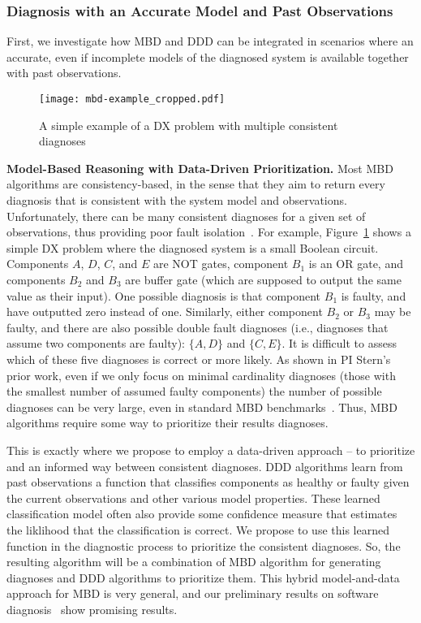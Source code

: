 \documentclass[12pt]{article}
\begin{document}
\subsubsection{Diagnosis with an Accurate Model and Past Observations}
First, we investigate how MBD and DDD can be integrated in scenarios where an accurate, even if incomplete models of the diagnosed system is available together with past observations. 


\begin{figure}
    \centering
	\texttt{[image: mbd-example\_cropped.pdf]}
    \caption{A simple example of a DX problem with multiple consistent diagnoses}
    \label{fig:mbd-example}
\end{figure}

{\bf Model-Based Reasoning with Data-Driven Prioritization.} 
Most MBD algorithms are consistency-based, in the sense that they aim to return every diagnosis  that is consistent with the system model and observations. 
Unfortunately, there can be many consistent diagnoses for a given set of observations, thus providing poor fault isolation~\cite{stern2015many}. 
For example, Figure~\ref{fig:mbd-example} shows a simple DX problem where the diagnosed system is a small Boolean circuit. Components $A$, $D$, $C$, and $E$ are NOT gates, component $B_1$ is an OR gate, and components $B_2$ and $B_3$ are buffer gate (which are supposed to output the same value as their input). One possible diagnosis is that component $B_1$ is faulty, and have outputted zero instead of one. Similarly, either component $B_2$ or $B_3$ may be faulty, 
and there are also possible double fault diagnoses (i.e., diagnoses that assume two components are faulty): $\{ A,D \}$ and $\{C,E\}$. It is difficult to assess which of these five diagnoses is correct or more likely. 
As shown in PI Stern's prior work, even if we only focus on minimal cardinality diagnoses (those with the smallest number of assumed faulty components) the number of possible diagnoses can be very large, even in standard MBD benchmarks~\cite{stern2015many}. Thus, MBD algorithms require some way to prioritize their results diagnoses. 


This is exactly where we propose to employ a data-driven approach -- to prioritize and an informed way between consistent diagnoses. 
DDD algorithms learn from past observations a function that classifies components as healthy or faulty given the current observations and other various model properties. These learned classification model often also provide some confidence measure that estimates the liklihood that the classification is correct. We propose to use this learned function in the diagnostic process to prioritize the consistent diagnoses. So, the resulting algorithm will be a combination of MBD algorithm for generating diagnoses and DDD algorithms to prioritize them. This hybrid model-and-data approach for MBD is very general, and our preliminary results on software diagnosis~\cite{elmishali2016data} show promising results. 
\end{document}
